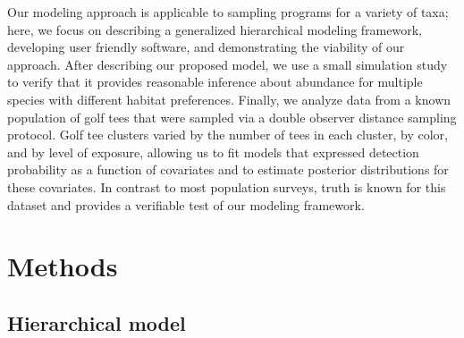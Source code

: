\documentclass[10pt]{article}
\begin{document}
Our modeling approach is applicable to sampling programs for a variety of taxa; here, we focus on describing a generalized hierarchical modeling framework, developing user friendly software, and demonstrating the viability of our approach.  After describing our proposed model, we use a small simulation study to verify that it provides reasonable inference about abundance for multiple species with different habitat preferences.  Finally, we analyze data from a known population of golf tees that were sampled via a double observer distance sampling protocol.  Golf tee clusters varied by the number of tees in each cluster, by color, and by level of exposure, allowing us to fit models that expressed detection probability as a function of covariates and to estimate posterior distributions for these covariates. In contrast to most population surveys, truth is known for this dataset and provides a verifiable test of our modeling framework.



\section*{Methods}

\subsection*{Hierarchical model}
\end{document}

